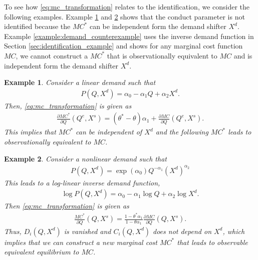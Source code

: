 \documentclass[11pt, a4paper]{article}
\newtheorem{example}{Example}
\theoremstyle{remark}
\begin{document}
To see how \eqref{eq:mc_transformation} relates to the identification, we consider the following examples.
Example \ref{example:bresnahan_1982} and \ref{example:log_linear} shows that the conduct parameter is not identified because the $MC^{*}$ can be independent form the demand shifter $X^{d}$.
Example \ref{example:demand_counterexample} uses the inverse demand function in Section \ref{sec:identification_example} and shows for any marginal cost function $MC$, we cannot construct a $MC^{*}$ that is observationally equivalent to $MC$ and is independent form the demand shifter $X^{d}$.

\begin{example}\label{example:bresnahan_1982}
    Consider a linear demand such that
    \begin{align}
        P(Q, X^{d}) = \alpha_0 - \alpha_1Q + \alpha_2X^{d}.
    \end{align}
    Then, \eqref{eq:mc_transformation} is given as
    \begin{align}
        \frac{\partial MC^{*}}{\partial Q}(Q^e, X^{s}) = (\theta^{*} - \theta)\alpha_1 + \frac{\partial MC}{\partial Q}(Q^e, X^{s}).
    \end{align}
    This implies that $MC^{*}$ can be independent of $X^{d}$ and the following $MC^{*}$ leads to observationally equivalent to $MC$.
\end{example}
\begin{example}\label{example:log_linear}
    Consider a nonlinear demand such that
    \begin{align}
        P(Q, X^{d}) = \exp(\alpha_0)Q^{-\alpha_1}(X^{d})^{\alpha_2}
    \end{align}
    This leads to a log-linear inverse demand function,
    \begin{align}
        \log P(Q, X^{d} ) = \alpha_0 - \alpha_1 \log Q + \alpha_2 \log X^{d}.
    \end{align}
    Then \eqref{eq:mc_transformation} is given as
    \begin{align}
        \frac{MC^{*}}{\partial Q}(Q, X^{s}) = \frac{1 - \theta^{*} \alpha_1}{1 - \theta \alpha_1} \frac{\partial MC}{\partial Q}(Q, X^{s}). 
    \end{align}
    Thus, $D_i(Q, X^{d})$ is vanished and $C_i(Q,X^{d})$ does not depend on $X^{d}$, which implies that we can construct a new marginal cost $MC^{*}$ that leads to observable equivalent equilibrium to $MC$.
\end{example}
\end{document}
